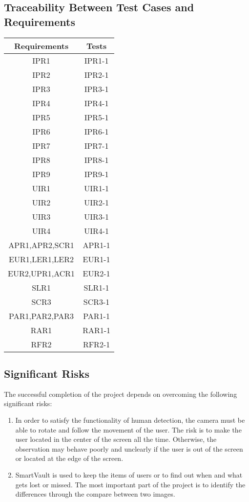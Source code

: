 \documentclass[12pt, titlepage]{article}
\begin{document}
\subsection{Traceability Between Test Cases and Requirements}
\begin{center}
    \begin{tabular}{||c | c ||}
    \hline
    Requirements & Tests\\
    \hline
    IPR1&IPR1-1\\
    \hline
    IPR2&IPR2-1\\
    \hline
    IPR3&IPR3-1\\
    \hline
    IPR4&IPR4-1\\
    \hline
    IPR5&IPR5-1\\
    \hline
    IPR6&IPR6-1\\
    \hline
    IPR7&IPR7-1\\
    \hline
    IPR8&IPR8-1\\
    \hline
    IPR9&IPR9-1\\
    \hline
    UIR1&UIR1-1\\
    \hline
    UIR2&UIR2-1\\
    \hline
    UIR3&UIR3-1\\
    \hline
    UIR4&UIR4-1\\
    \hline
    APR1,APR2,SCR1 & APR1-1\\
    \hline
    EUR1,LER1,LER2 & EUR1-1\\
    \hline
    EUR2,UPR1,ACR1 & EUR2-1\\
    \hline
    SLR1 & SLR1-1\\
    \hline
    SCR3 & SCR3-1\\
    \hline
    PAR1,PAR2,PAR3 & PAR1-1\\
    \hline
    RAR1 & RAR1-1\\
    \hline
    RFR2 & RFR2-1\\
    \hline
    \end{tabular}
    
\end{center}


\subsection{Significant Risks}
The successful completion of the project depends on overcoming the following significant risks:
\begin{enumerate}
\item{}
In order to satisfy the functionality of human detection, the camera must be able to rotate and follow the movement of the user. The risk is to make the user located in the center of the screen all the time. Otherwise, the observation may behave poorly and unclearly if the user is out of the screen or located at the edge of the screen.			
\item{}
SmartVault is used to keep the items of users or to find out when and what gets lost or missed. The most important part of the project is to identify the differences through the compare between two images.
\end{enumerate}
\end{document}
